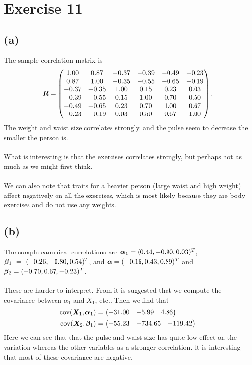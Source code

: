 
\section*{Exercise 11}
\label{sec:exericse-11}

\subsection*{(a)}
\label{sec:a-7}

The sample correlation matrix is
\begin{equation*}
  \bm{R} =
  \begin{pmatrix}
    1.00 &0.87 &-0.37 &-0.39 &-0.49 &-0.23 \\ 
    0.87 &1.00 &-0.35 &-0.55 &-0.65 &-0.19 \\ 
    -0.37 &-0.35 &1.00 &0.15 &0.23 &0.03 \\ 
    -0.39 &-0.55 &0.15 &1.00 &0.70 &0.50 \\ 
    -0.49 &-0.65 &0.23 &0.70 &1.00 &0.67 \\ 
    -0.23 &-0.19 &0.03 &0.50 &0.67 &1.00  
  \end{pmatrix}.
\end{equation*}
The weight and waist size correlates strongly, and the pulse seem to
decrease the smaller the person is. \\
\\
What is interesting is that the exercises correlates strongly, but
perhaps not as much as we might first think. \\
\\
We can also note that traits for a heavier person (large waist and high
weight) affect negatively on all the exercises, which is most likely
because they are body exercises and do not use any weights.

\subsection*{(b)}
\label{sec:b-10}

The sample canonical correlations are $\bm{\alpha}_1 = (0.44, -0.90, 0.03
)^T$, $\bm{\beta}_1~=~(-0.26, -0.80, 0.54 )^T$, and $\bm{\alpha} = (-0.16 ,0.43 ,0.89  
)^T$ and $\bm{\beta}_2 = (-0.70 ,0.67 ,-0.23 )^T$. \\
\\
These are harder to interpret. From \cite[pp.545-547]{book} it is
suggested that we compute the covariance between $\alpha_1$ and $X_1$,
etc.. Then we find that 
\begin{align*}
  \text{cov}(\bm{X}_1,\bm{\alpha}_1) &=
  \begin{pmatrix}
    -31.00 &-5.99 &4.86 
  \end{pmatrix} \\
  \text{cov}(\bm{X}_2,\bm{\beta}_1) &=
  \begin{pmatrix}
    -55.23 &-734.65 &-119.42  
  \end{pmatrix}
\end{align*}
Here we can see that that the pulse and waist size has quite low effect
on the variation  whereas the other variables as a stronger
correlation. It is interesting that most of these covariance are
negative.  

